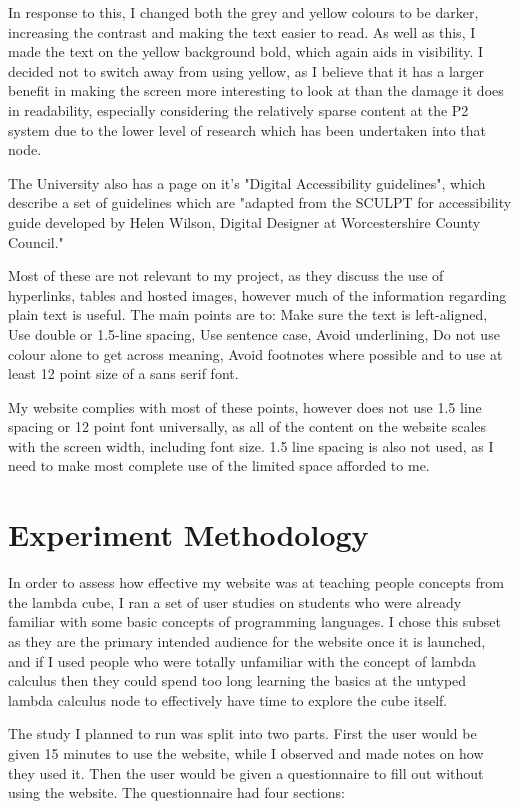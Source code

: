 \documentclass{l4proj}
\begin{document}
In response to this, I changed both the grey and yellow colours to be darker, increasing the contrast and making the text easier to read.  As well as this, I made the text on the yellow background bold, which again aids in visibility.  I decided not to switch away from using yellow, as I believe that it has a larger benefit in making the screen more interesting to look at than the damage it does in readability, especially considering the relatively sparse content at the P2 system due to the lower level of research which has been undertaken into that node.

The University also has a page on it's "Digital Accessibility guidelines", which describe a set of guidelines which are "adapted from the SCULPT for accessibility guide developed by Helen Wilson, Digital Designer at Worcestershire County Council."

Most of these are not relevant to my project, as they discuss the use of hyperlinks, tables and hosted images, however much of the information regarding plain text is useful.  The main points are to: Make sure the text is left-aligned, Use double or 1.5-line spacing, Use sentence case, Avoid underlining, Do not use colour alone to get across meaning, Avoid footnotes where possible and to use at least 12 point size of a sans serif font.

My website complies with most of these points, however does not use 1.5 line spacing or 12 point font universally, as all of the content on the website scales with the screen width, including font size.  1.5 line spacing is also not used, as I need to make most complete use of the limited space afforded to me.

\section{Experiment Methodology}

In order to assess how effective my website was at teaching people concepts from the lambda cube, I ran a set of user studies on students who were already familiar with some basic concepts of programming languages.  I chose this subset as they are the primary intended audience for the website once it is launched, and if I used people who were totally unfamiliar with the concept of lambda calculus then they could spend too long learning the basics at the untyped lambda calculus node to effectively have time to explore the cube itself.

The study I planned to run was split into two parts.  First the user would be given 15 minutes to use the website, while I observed and made notes on how they used it.  Then the user would be given a questionnaire to fill out without using the website.  The questionnaire had four sections:
\end{document}
